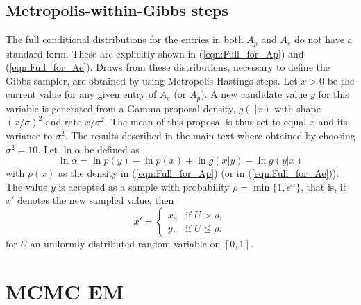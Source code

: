\documentclass[11pt]{amsart}
\theoremstyle{definition}
\theoremstyle{remark}
\begin{document}
\subsection{Metropolis-within-Gibbs steps}\label{sec:MHsteps}
The full conditional distributions for the entries in both $A_p$ and
$A_e$ do not have a standard form. These are explicitly shown in
(\ref{eqn:Full_for_Ap}) and (\ref{eqn:Full_for_Ae}). Draws from these
distributions, necessary to define the Gibbs sampler,  are obtained by
using Metropolis-Hastings steps.  Let $x > 0$ be the current value
for any given entry of $A_e$ (or $A_p$). A new candidate value $y$ for
this variable is generated from a Gamma proposal density, $g(\cdot|
x)$ with shape $(x/\sigma)^2$ and rate $x/\sigma^2$. The mean of this
proposal is thus set to equal $x$ and its variance to $\sigma^2$. The 
results  described in the main text where obtained by
choosing $\sigma^2 = 10$. Let $\ln \alpha$ be defined as
\[
  \ln \alpha 
 =
  \ln p(y) - \ln p(x) + \ln g(x|y) - \ln g(y|x)
\]
with $p(x)$ as the density in (\ref{eqn:Full_for_Ap}) (or in  
(\ref{eqn:Full_for_Ae})). The value $y$ is accepted as a sample
with probability $\rho = \min\{1, e^{\alpha}\}$, that is, if $x'$ denotes
the new sampled value, then
\[
   x'
    =
  \begin{cases}
    x, & \text{if } U > \rho,\\
    y, & \text{if } U \leq \rho.
  \end{cases}
\]
for $U$ an uniformly distributed random variable on $[0, 1]$.

\section{MCMC EM}
\end{document}

